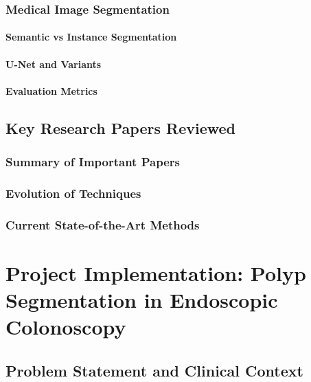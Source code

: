 \documentclass[12pt,a4paper]{report}
\begin{document}
\subsection{Medical Image Segmentation}

\subsubsection{Semantic vs Instance Segmentation}

\subsubsection{U-Net and Variants}

\subsubsection{Evaluation Metrics}

\section{Key Research Papers Reviewed}

\subsection{Summary of Important Papers}

\subsection{Evolution of Techniques}

\subsection{Current State-of-the-Art Methods}

\chapter{Project Implementation: Polyp Segmentation in Endoscopic Colonoscopy}

\section{Problem Statement and Clinical Context}
\end{document}
